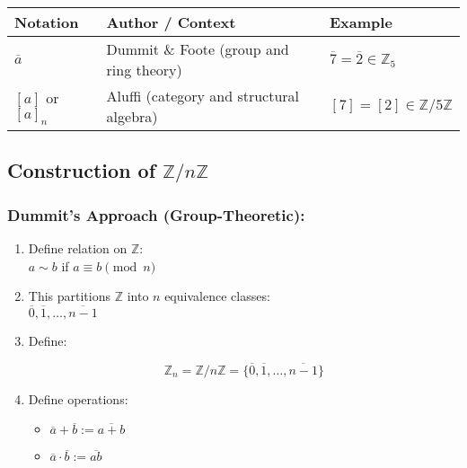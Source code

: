\documentclass[
]{article}
\providecommand{\tightlist}{%
  \setlength{\itemsep}{0pt}\setlength{\parskip}{0pt}}
\begin{document}
\begin{longtable}[]{@{}
  >{\raggedright\arraybackslash}p{}
  >{\raggedright\arraybackslash}p{}
  >{\raggedright\arraybackslash}p{}@{}}
\toprule\noalign{}
\begin{minipage}[b]{\linewidth}\raggedright
Notation
\end{minipage} & \begin{minipage}[b]{\linewidth}\raggedright
Author / Context
\end{minipage} & \begin{minipage}[b]{\linewidth}\raggedright
Example
\end{minipage} \\
\midrule\noalign{}
\endhead
\bottomrule\noalign{}
\endlastfoot
\(\overline{a}\) & Dummit \& Foote (group and ring theory) &
\(\overline{7} = \overline{2} \in \mathbb{Z}_5\) \\
\([a]\) or \([a]_n\) & Aluffi (category and structural algebra) &
\([7] = [2] \in \mathbb{Z}/5\mathbb{Z}\) \\
\end{longtable}

\subsection{\texorpdfstring{Construction of
\(\mathbb{Z}/n\mathbb{Z}\)}{Construction of \textbackslash mathbb\{Z\}/n\textbackslash mathbb\{Z\}}}\label{construction-of-mathbbznmathbbz}

\subsubsection{Dummit's Approach
(Group-Theoretic):}\label{dummits-approach-group-theoretic}

\begin{enumerate}
\def\labelenumi{\arabic{enumi}.}
\item
  Define relation on \(\mathbb{Z}\):\\
  \(a \sim b\) if \(a \equiv b \pmod{n}\)
\item
  This partitions \(\mathbb{Z}\) into \(n\) equivalence classes:\\
  \(\overline{0}, \overline{1}, \dots, \overline{n-1}\)
\item
  Define:

  \[
  \mathbb{Z}_n = \mathbb{Z}/n\mathbb{Z} = \{ \overline{0}, \overline{1}, \dots, \overline{n-1} \}
  \]
\item
  Define operations:

  \begin{itemize}
  \tightlist
  \item
    \(\overline{a} + \overline{b} := \overline{a + b}\)
  \item
    \(\overline{a} \cdot \overline{b} := \overline{ab}\)
  \end{itemize}
\end{enumerate}
\end{document}
